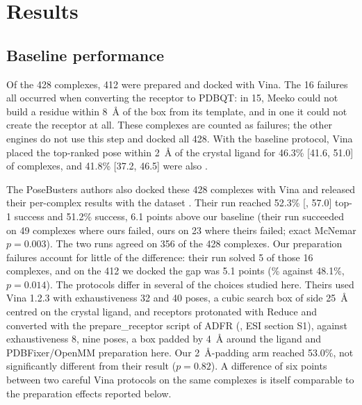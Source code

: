 \section{Results}
\label{sec:results}


\subsection{Baseline performance}

Of the 428 complexes, 412 were prepared and docked with Vina. The 16 failures all occurred
when converting the receptor to PDBQT: in 15, Meeko could not build a residue within
\SI{8}{\angstrom} of the box from its template, and in one it could not create the receptor
at all. These
complexes are counted as failures; the other engines do not use this step and docked all
428. With the baseline protocol, Vina placed the top-ranked pose within \SI{2}{\angstrom} of
the crystal ligand for 46.3\% [41.6, 51.0] of complexes, and 41.8\% [37.2, 46.5] were also
\pbvalid{}.

The PoseBusters authors also docked these 428 complexes with Vina and released their
per-complex results with the dataset \citep{posebusters2023data}. Their run reached 52.3\%
[, 57.0] top-1 success and 51.2\% \pbvalid{} success, 6.1 points above our baseline
(their run succeeded on 49 complexes where ours failed, ours on 23 where theirs failed;
exact McNemar $p = 0.003$). The two runs agreed on 356 of the 428 complexes. Our
preparation failures account for little of the difference: their run solved 5 of those 16
complexes, and on the 412 we docked the gap was 5.1 points (\% against 48.1\%,
$p = 0.014$). The protocols differ in several of the choices studied here. Theirs used Vina
1.2.3 with exhaustiveness 32 and 40 poses, a cubic search box of side \SI{25}{\angstrom}
centred on the crystal ligand, and receptors protonated with Reduce \citep{word1999reduce}
and converted with the prepare\_receptor script of ADFR \citep{ravindranath2015autodockfr}
(\citealp{buttenschoen2024posebusters}, ESI section S1), against exhaustiveness 8, nine
poses, a box
padded by \SI{4}{\angstrom} around the ligand and PDBFixer/OpenMM preparation here. Our
\SI{2}{\angstrom}-padding arm reached 53.0\%, not significantly different from their result
($p = 0.82$). A difference of six points between two careful Vina protocols on the same
complexes is itself comparable to the preparation effects reported below.

